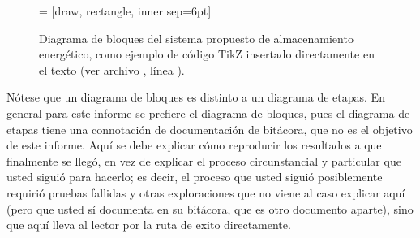 \begin{figure}[htb]

  
  \centering
   = [draw, rectangle, inner sep=6pt]
  \caption[Diagrama de bloques.]{Diagrama de bloques del sistema
    propuesto de almacenamiento energético, como ejemplo de código
    TikZ insertado directamente en el texto (ver archivo
    , línea \number{}).}
  \label{fig:diagbloques}
\end{figure}

Nótese que un diagrama de bloques es distinto a un diagrama de etapas.
En general para este informe se prefiere el diagrama de bloques, pues
el diagrama de etapas tiene una connotación de documentación de
bitácora, que no es el objetivo de este informe.  Aquí se debe
explicar cómo reproducir los resultados a que finalmente se llegó, en
vez de explicar el proceso circunstancial y particular que usted
siguió para hacerlo; es decir, el proceso que usted siguió
posiblemente requirió pruebas fallidas y otras exploraciones que no
viene al caso explicar aquí (pero que usted sí documenta en su
bitácora, que es otro documento aparte), sino que aquí lleva al lector
por la ruta de exito directamente.

